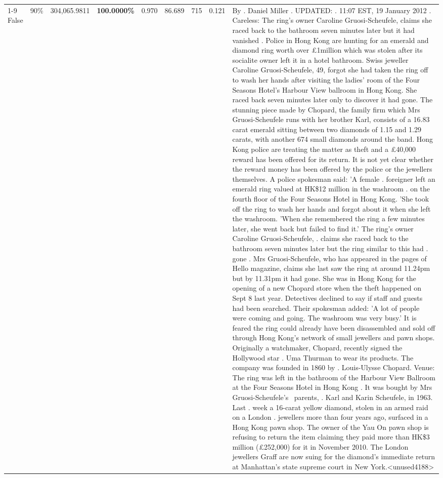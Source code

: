 \begin{table}[H]
\begin{tabular}{lllrlllll}
\cline{1-9} \cline{2-9}
False & 90\% & \color{red} 304,065.9811 & \bfseries \color{red} 100.0000\% & 0.970 & 86.689 & 715 & 0.121 & By . Daniel Miller . UPDATED: . 11:07 EST, 19 January 2012 . Careless: The ring's owner Caroline Gruosi-Scheufele, claims she raced back to the bathroom seven minutes later but it had vanished . Police in Hong Kong are hunting for an emerald and diamond ring worth over £1million which was stolen after its socialite owner left it in a hotel bathroom. Swiss jeweller Caroline Gruosi-Scheufele, 49, forgot she had taken the ring off to wash her hands after visiting the ladies' room of the Four Seasons Hotel's Harbour View ballroom in Hong Kong. She raced back seven minutes later only to discover it had gone. The stunning piece made by Chopard, the family firm which Mrs Gruosi-Scheufele runs with her brother Karl, consists of a 16.83 carat emerald sitting between two diamonds of 1.15 and 1.29 carats, with another 674 small diamonds around the band. Hong Kong police are treating the matter as theft and a £40,000 reward has been offered for its return. It is not yet clear whether the reward money has been offered by the police or the jewellers themselves. A police spokesman said: 'A female . foreigner left an emerald ring valued at HK\$12 million in the washroom . on the fourth floor of the Four Seasons Hotel in Hong Kong. 'She took off the ring to wash her hands and forgot about it when she left the washroom. 'When she remembered the ring a few minutes later, she went back but failed to find it.' The ring's owner Caroline Gruosi-Scheufele, . claims she raced back to the bathroom seven minutes later but the ring similar to this had . gone . Mrs Gruosi-Scheufele, who has appeared in the pages of Hello magazine, claims she last saw the ring at around 11.24pm but by 11.31pm it had gone. She was in Hong Kong for the opening of a new Chopard store when the theft happened on Sept 8 last year. Detectives declined to say if staff and guests had been searched. Their spokesman added: 'A lot of people were coming and going. The washroom was very busy.' It is feared the ring could already have been disassembled and sold off through Hong Kong's network of small jewellers and pawn shops. Originally a watchmaker, Chopard, recently signed the Hollywood star . Uma Thurman to wear its products. The company was founded in 1860 by . Louis-Ulysse Chopard. Venue: The ring was left in the bathroom of the Harbour View Ballroom at the Four Seasons Hotel in Hong Kong . It was bought by Mrs Gruosi-Scheufele's  parents, . Karl and Karin Scheufele, in 1963. Last . week a 16-carat yellow diamond, stolen in an armed raid on a London . jewellers more than four years ago, surfaced in a Hong Kong pawn shop. The owner of the Yau On pawn shop is refusing to return the item claiming they paid more than HK\$3 million (£252,000) for it in November 2010. The London jewellers Graff are now suing for the diamond’s immediate return at Manhattan’s state supreme court in New York.<unused4188> \\

\end{tabular}
\end{table}
